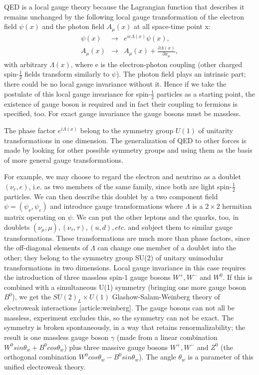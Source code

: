 QED is a local gauge theory because the Lagrangian function that describes it remains unchanged by the following local gauge transformation of the electron field $\psi(x)$ and the photon field $A_\mu(x)$ at all space-time point x:
    \begin{eqnarray}
    \psi(x) & \rightarrow & e^{ie\Lambda(x)}\psi(x), \nonumber \\
    A_\mu(x) & \rightarrow & A_\mu(x) + \frac{\partial \Lambda(x)}{\partial x_\mu}, \nonumber
    \end{eqnarray}
with arbitrary $\Lambda(x)$, where e is the electron-photon coupling (other charged spin-$\frac{1}{2}$ fields transform similarly to $\psi$). The photon field plays an intrinsic part; there could be no local gauge invariance without it. Hence if we take the postulate of this local gauge invariance for spin-$\frac{1}{2}$ particles as a starting point, the existence of gauge boson is required and in fact their coupling to fermions is specified, too. For exact gauge invariance the gauge bosons must be massless.

The phase factor $e^{i\Lambda(x)}$ belong to the symmetry group $U(1)$ of unitarity transformations in one dimension. The generalization of QED to other forces is made by looking for other possible symmetry groups and using them as the basis of more general gauge transformations. 
        
For example, we may choose to regard the electron and neutrino as a doublet $(\nu_e,e)$, i.e. as two members of the same family, since both are light spin-$\frac{1}{2}$ particles. We can then describe this doublet by a two component field $\psi = (\psi_\nu,\psi_e)$ and introduce gauge transformations where $\Lambda$ is a $2\times 2$ hermitian matrix operating on $\psi$.  We can put the other leptons and the quarks, too, in doublets $(\nu_\mu,\mu),(\nu_\tau,\tau),(u,d),etc.$ and subject them to similar gauge transformations. These transformations are much more than phase factors, since the off-diagonal elements of $\Lambda$ can change one member of a doublet into the other; they belong to the symmetry group SU(2) of unitary unimodular transformations in two dimensions. Local gauge invariance in this case requires the introduction of three massless spin-1 gauge bosons $W^+,W^-$ and $W^0$. If this is combined with a simultaneous U(1) symmetry (bringing one more gauge boson $B^0$), we get the $SU(2)_L\times U(1)$ Glashow-Salam-Weinberg theory of electroweak interactions [article:weinberg]. The gauge bosons can not all be massless, experiment excludes this, so the symmetry can not be exact. The symmetry is broken spontaneously, in a way that retains renormalizability; the result is one massless gauge boson $\gamma$ (made from a linear combination $W^0sin\theta_w +B^0cos\theta_w$) plus three massive gauge bosons $W^+, W^-$ and $Z^0$ (the orthogonal combination $W^0cos\theta_w - B^0sin\theta_w$). The angle $\theta_w$ is a parameter of this unified electroweak theory.

